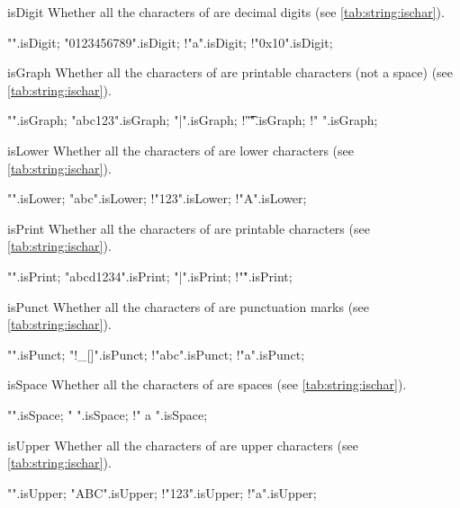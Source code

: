 \begin{urbiscriptapi}
\item[isDigit] Whether all the characters of \this are decimal digits (see
  \autoref{tab:string:ischar}).
\begin{urbiassert}
           "".isDigit;
 "0123456789".isDigit;
         !"a".isDigit;  !"0x10".isDigit;
\end{urbiassert}


\item[isGraph] Whether all the characters of \this are printable characters
  (not a space) (see \autoref{tab:string:ischar}).
\begin{urbiassert}
          "".isGraph;
    "abc123".isGraph;
       "{|}".isGraph;
   !"\t\n\r".isGraph; !" ".isGraph;
\end{urbiassert}


\item[isLower] Whether all the characters of \this are lower characters (see
  \autoref{tab:string:ischar}).
\begin{urbiassert}
          "".isLower;
       "abc".isLower;
      !"123".isLower;  !"A".isLower;
\end{urbiassert}


\item[isPrint] Whether all the characters of \this are printable characters
  (see \autoref{tab:string:ischar}).
\begin{urbiassert}
          "".isPrint;
  "abcd1234".isPrint;
       "{|}".isPrint; !"\r".isPrint;
\end{urbiassert}


\item[isPunct] Whether all the characters of \this are punctuation marks
  (see \autoref{tab:string:ischar}).
\begin{urbiassert}
         "".isPunct;
     "!_[]".isPunct;
     !"abc".isPunct;  !"a".isPunct;
\end{urbiassert}


\item[isSpace] Whether all the characters of \this are spaces (see
  \autoref{tab:string:ischar}).
\begin{urbiassert}
          "".isSpace;
       "   ".isSpace;
      !" a ".isSpace;
\end{urbiassert}


\item[isUpper] Whether all the characters of \this are upper characters (see
  \autoref{tab:string:ischar}).
\begin{urbiassert}
          "".isUpper;
       "ABC".isUpper;
      !"123".isUpper; !"a".isUpper;
\end{urbiassert}



\end{urbiscriptapi}
